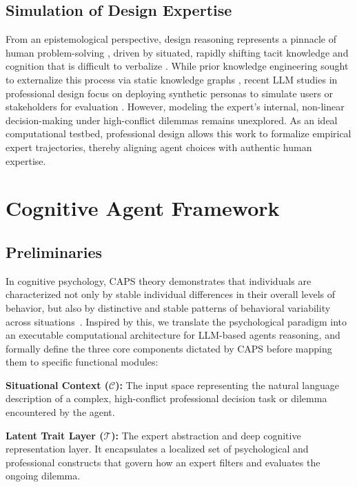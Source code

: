 \documentclass[11pt]{article}
\begin{document}
\subsection{Simulation of Design Expertise}
From an epistemological perspective, design reasoning represents a pinnacle of human problem-solving \cite{lou2023human}, driven by situated, rapidly shifting tacit knowledge and cognition that is difficult to verbalize \cite{cross1982designerly,schindler2015expertise}. While prior knowledge engineering sought to externalize this process via static knowledge graphs \cite{jia2025knowledge}, recent LLM studies in professional design focus on deploying synthetic personas to simulate users or stakeholders for evaluation \cite{pang2025understanding,lin2025creativity,schmidt2024simulating,lu2025uxagent}. However, modeling the expert's internal, non-linear decision-making under high-conflict dilemmas remains unexplored. As an ideal computational testbed, professional design allows this work to formalize empirical expert trajectories, thereby aligning agent choices with authentic human expertise.

\section{Cognitive Agent Framework}
\label{sec:framework}
\subsection{Preliminaries}
In cognitive psychology, CAPS theory demonstrates that individuals are characterized not only by stable individual differences in their overall levels of behavior, but also by distinctive and stable patterns of behavioral variability across situations~\cite{mischel1995cognitive}. Inspired by this, we translate the psychological paradigm into an executable computational architecture for LLM-based agents reasoning, and formally define the three core components dictated by CAPS before mapping them to specific functional modules:

\textbf{Situational Context ($\mathcal{C}$):} The input space representing the natural language description of a complex, high-conflict professional decision task or dilemma encountered by the agent.

\textbf{Latent Trait Layer ($\mathcal{T}$):} The expert abstraction and deep cognitive representation layer. It encapsulates a localized set of psychological and professional constructs that govern how an expert filters and evaluates the ongoing dilemma.
\end{document}
